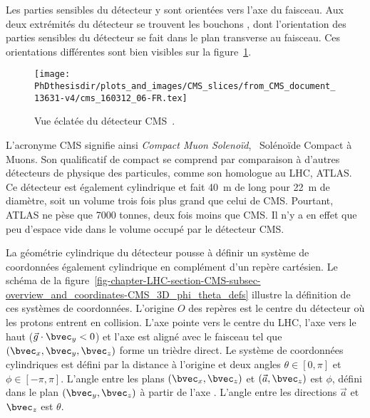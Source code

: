 Les parties sensibles du détecteur y sont orientées vers l'axe du faisceau.
Aux deux extrémités du détecteur se trouvent les \og bouchons \fg, dont l'orientation des parties sensibles du détecteur se fait dans le plan transverse au faisceau.
Ces orientations différentes sont bien visibles sur la figure~\ref{fig-chapter-LHC-section-CMS-subsec-overview_and_coordinates-vue_eclatee_CMS}.
\begin{figure}[h]
\centering
\texttt{[image: \\PhDthesisdir/plots\_and\_images/CMS\_slices/from\_CMS\_document\_13631-v4/cms\_160312\_06-FR.tex]}
\caption[Vue éclatée du détecteur CMS.]{Vue éclatée du détecteur CMS~\cite{CMS_document_13631-v4}.}
\label{fig-chapter-LHC-section-CMS-subsec-overview_and_coordinates-vue_eclatee_CMS}
\end{figure}
\par L'acronyme CMS signifie ainsi \emph{Compact Muon Solenoïd}, \ie\ Solénoïde Compact à Muons.
Son qualificatif de \og compact \fg{} se comprend par comparaison à d'autres détecteurs de physique des particules, comme son homologue au LHC, ATLAS.
Ce détecteur est également cylindrique et fait \SI{40}{\meter} de long pour \SI{22}{\meter} de diamètre, soit un volume trois fois plus grand que celui de CMS.
Pourtant, ATLAS ne pèse \og que \fg{} \num{7000} tonnes, deux fois moins que CMS.
Il n'y a en effet que peu d'espace vide dans le volume occupé par le détecteur CMS.
\par La géométrie cylindrique du détecteur pousse à définir un système de coordonnées également cylindrique en complément d'un repère cartésien.
Le schéma de la figure~\ref{fig-chapter-LHC-section-CMS-subsec-overview_and_coordinates-CMS_3D_phi_theta_defs} illustre la définition de ces systèmes de coordonnées.
L'origine $O$ des repères est le centre du détecteur où les protons entrent en collision.
L'axe  pointe vers le centre du LHC, l'axe  vers le haut ($\vec{g}\cdot\bvec_y<0$) et l'axe  est aligné avec le faisceau tel que $(\bvec_x, \bvec_y, \bvec_z)$ forme un trièdre direct.
Le système de coordonnées cylindriques est défini par la distance à l'origine et deux angles $\theta\in[0,\pi]$ et $\phi\in[-\pi,\pi]$.
L'angle entre les plans $(\bvec_x, \bvec_z)$ et $(\vec{a}, \bvec_z)$ est $\phi$, défini dans le plan $(\bvec_y,\bvec_z)$ à partir de l'axe .
L'angle entre les directions $\vec{a}$ et $\bvec_z$ est $\theta$.
